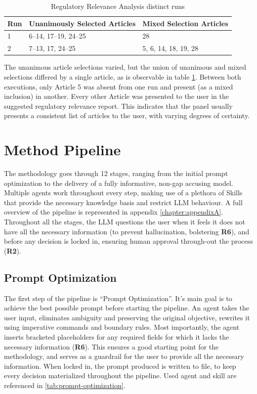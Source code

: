 \begin{table}[!bt]
\centering
\begin{tabular}{lll}
\hline
\textbf{Run} & \textbf{Unanimously Selected Articles} & \textbf{Mixed Selection Articles} \\
\hline
1 & 6–14, 17–19, 24–25 & 28 \\
\hline
2 & 7–13, 17, 24–25 & 5, 6, 14, 18, 19, 28 \\
\end{tabular}
\caption{Regulatory Relevance Analysis distinct runs}
\label{tab:Article-selection-round}
\end{table}

The unanimous article selections varied, but the union of unanimous and mixed selections differed by a single article, as is observable in table \ref{tab:Article-selection-round}. Between both executions, only Article 5 was absent from one run and present (as a mixed inclusion) in another. Every other Article was presented to the user in the suggested regulatory relevance report. This indicates that the panel usually presents a consistent list of articles to the user, with varying degrees of certainty.

\section{Method Pipeline}
\label{methodPipeline}

The methodology goes through 12 stages, ranging from the initial prompt optimization to the delivery of a fully informative, non-gap accusing model. Multiple agents work throughout every step, making use of a plethora of \gls{Skill}s that provide the necessary knowledge basis and restrict \ac{LLM} behaviour. A full overview of the pipeline is represented in appendix \ref{chapter:appendixA}. Throughout all the stages, the \ac{LLM} questions the user when it feels it does not have all the necessary information (to prevent hallucination, bolstering \textbf{R6}), and before any decision is locked in, ensuring human approval through-out the process (\textbf{R2}).

\subsection{Prompt Optimization}

The first step of the pipeline is ``Prompt Optimization''. It's main goal is to achieve the best possible prompt before starting the pipeline. An agent takes the user input, eliminates ambiguity and preserving the original objective, rewrites it using imperative commands and boundary rules. Most importantly, the agent inserts bracketed placeholders for any required fields for which it lacks the necessary information (\textbf{R6}).
This ensures a good starting point for the methodology, and serves as a guardrail for the user to provide all the necessary information. When locked in, the prompt produced is written to file, to keep every decision materialized throughout the pipeline. Used agent and skill are referenced in \ref{tab:prompt-optimization}. 

